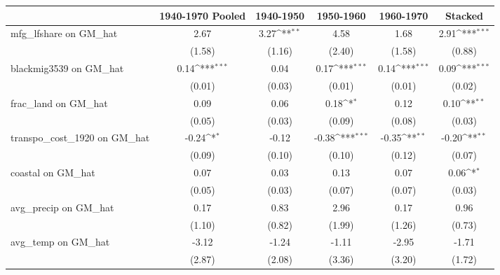{
\def\sym#1{\ifmmode^{#1}\else\(^{#1}\)\fi}
\begin{tabular}{l*{5}{c}}
\toprule
                &\multicolumn{1}{c}{1940-1970 Pooled}&\multicolumn{1}{c}{1940-1950}&\multicolumn{1}{c}{1950-1960}&\multicolumn{1}{c}{1960-1970}&\multicolumn{1}{c}{Stacked}\\
\midrule
mfg\_lfshare on GM\_hat&     2.67         &     3.27\sym{**} &     4.58         &     1.68         &     2.91\sym{***}\\
                &   (1.58)         &   (1.16)         &   (2.40)         &   (1.58)         &   (0.88)         \\
\addlinespace
blackmig3539 on GM\_hat&     0.14\sym{***}&     0.04         &     0.17\sym{***}&     0.14\sym{***}&     0.09\sym{***}\\
                &   (0.01)         &   (0.03)         &   (0.01)         &   (0.01)         &   (0.02)         \\
\addlinespace
frac\_land on GM\_hat&     0.09         &     0.06         &     0.18\sym{*}  &     0.12         &     0.10\sym{**} \\
                &   (0.05)         &   (0.03)         &   (0.09)         &   (0.08)         &   (0.03)         \\
\addlinespace
transpo\_cost\_1920 on GM\_hat&    -0.24\sym{*}  &    -0.12         &    -0.38\sym{***}&    -0.35\sym{**} &    -0.20\sym{**} \\
                &   (0.09)         &   (0.10)         &   (0.10)         &   (0.12)         &   (0.07)         \\
\addlinespace
coastal on GM\_hat&     0.07         &     0.03         &     0.13         &     0.07         &     0.06\sym{*}  \\
                &   (0.05)         &   (0.03)         &   (0.07)         &   (0.07)         &   (0.03)         \\
\addlinespace
avg\_precip on GM\_hat&     0.17         &     0.83         &     2.96         &     0.17         &     0.96         \\
                &   (1.10)         &   (0.82)         &   (1.99)         &   (1.26)         &   (0.73)         \\
\addlinespace
avg\_temp on GM\_hat&    -3.12         &    -1.24         &    -1.11         &    -2.95         &    -1.71         \\
                &   (2.87)         &   (2.08)         &   (3.36)         &   (3.20)         &   (1.72)         \\

\end{tabular}}
